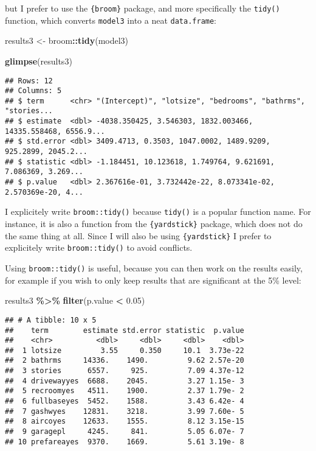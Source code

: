 \documentclass[
]{article}
\newenvironment{Shaded}{\begin{snugshade}}{\end{snugshade}}
\newcommand{\FloatTok}[1]{\textcolor[rgb]{0.00,0.00,0.81}{#1}}
\newcommand{\KeywordTok}[1]{\textcolor[rgb]{0.13,0.29,0.53}{\textbf{#1}}}
\newcommand{\NormalTok}[1]{#1}
\newcommand{\OperatorTok}[1]{\textcolor[rgb]{0.81,0.36,0.00}{\textbf{#1}}}
\newcommand{\StringTok}[1]{\textcolor[rgb]{0.31,0.60,0.02}{#1}}
\begin{document}
but I prefer to use the \texttt{\{broom\}} package, and more specifically the \texttt{tidy()} function, which
converts \texttt{model3} into a neat \texttt{data.frame}:

\begin{Shaded}
\begin{Highlighting}[]
\NormalTok{results3 \textless{}{-}}\StringTok{ }\NormalTok{broom}\OperatorTok{::}\KeywordTok{tidy}\NormalTok{(model3)}

\KeywordTok{glimpse}\NormalTok{(results3)}
\end{Highlighting}
\end{Shaded}

\begin{verbatim}
## Rows: 12
## Columns: 5
## $ term      <chr> "(Intercept)", "lotsize", "bedrooms", "bathrms", "stories...
## $ estimate  <dbl> -4038.350425, 3.546303, 1832.003466, 14335.558468, 6556.9...
## $ std.error <dbl> 3409.4713, 0.3503, 1047.0002, 1489.9209, 925.2899, 2045.2...
## $ statistic <dbl> -1.184451, 10.123618, 1.749764, 9.621691, 7.086369, 3.269...
## $ p.value   <dbl> 2.367616e-01, 3.732442e-22, 8.073341e-02, 2.570369e-20, 4...
\end{verbatim}

I explicitely write \texttt{broom::tidy()} because \texttt{tidy()} is a popular function name. For instance,
it is also a function from the \texttt{\{yardstick\}} package, which does not do the same thing at all. Since
I will also be using \texttt{\{yardstick\}} I prefer to explicitely write \texttt{broom::tidy()} to avoid conflicts.

Using \texttt{broom::tidy()} is useful, because you can then work on the results easily, for example if
you wish to only keep results that are significant at the 5\% level:

\begin{Shaded}
\begin{Highlighting}[]
\NormalTok{results3 }\OperatorTok{\%\textgreater{}\%}
\StringTok{  }\KeywordTok{filter}\NormalTok{(p.value }\OperatorTok{\textless{}}\StringTok{ }\FloatTok{0.05}\NormalTok{)}
\end{Highlighting}
\end{Shaded}

\begin{verbatim}
## # A tibble: 10 x 5
##    term        estimate std.error statistic  p.value
##    <chr>          <dbl>     <dbl>     <dbl>    <dbl>
##  1 lotsize         3.55     0.350     10.1  3.73e-22
##  2 bathrms     14336.    1490.         9.62 2.57e-20
##  3 stories      6557.     925.         7.09 4.37e-12
##  4 drivewayyes  6688.    2045.         3.27 1.15e- 3
##  5 recroomyes   4511.    1900.         2.37 1.79e- 2
##  6 fullbaseyes  5452.    1588.         3.43 6.42e- 4
##  7 gashwyes    12831.    3218.         3.99 7.60e- 5
##  8 aircoyes    12633.    1555.         8.12 3.15e-15
##  9 garagepl     4245.     841.         5.05 6.07e- 7
## 10 prefareayes  9370.    1669.         5.61 3.19e- 8
\end{verbatim}
\end{document}
